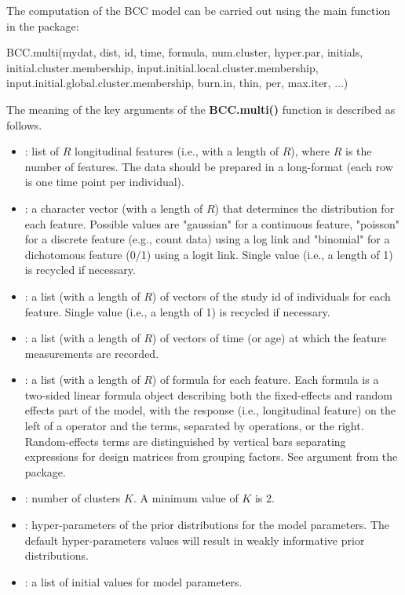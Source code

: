 The computation of the BCC model can be carried out using the main function in the   package: 
\begin{example}
BCC.multi(mydat, dist, id, time, formula, num.cluster,  
		 hyper.par, initials, initial.cluster.membership, 
		 input.initial.local.cluster.membership, 
		 input.initial.global.cluster.membership,
		 burn.in, thin, per, max.iter, ...)
\end{example}
The meaning of the key arguments of the \textbf{BCC.multi()} function is described as follows. 
\begin{itemize}
	\item {}: list of $R$ longitudinal features (i.e., with a length of $R$), where $R$ is the number of features. The data should be prepared in a long-format (each row is one time point per individual). 
	\item {}:  a character vector (with a length of $R$) that determines the distribution for each feature. Possible values are "gaussian" for a continuous feature, "poisson" for a discrete feature (e.g., count data) using a log link and "binomial" for a dichotomous feature (0/1) using a logit link. Single value (i.e., a length of 1) is recycled if necessary. 
	\item {}: a list (with a length of $R$)  of vectors of the study id of individuals for each feature. Single value (i.e., a length of 1) is recycled if necessary. 
	\item {}: a list (with a length of $R$) of vectors of time (or age) at which the feature measurements are recorded. 
	\item {}: a list (with a length of $R$) of formula for each feature. Each formula is a two-sided linear formula object describing both the fixed-effects and random effects part of the model, with the response (i.e., longitudinal feature) on the left of a \code{~} operator and the terms, separated by  \code{+} operations, or the right. Random-effects terms are distinguished by vertical bars \code{(|)} separating expressions for design matrices from grouping factors. See  argument from the  package. 
	\item  {}: number of clusters $K$. A minimum value of $K$ is 2. 
	\item  {}: hyper-parameters of the prior distributions for the model parameters. The default hyper-parameters values will result in weakly informative prior distributions. 
	\item  {}: a list of initial values for model parameters.

\end{itemize}
